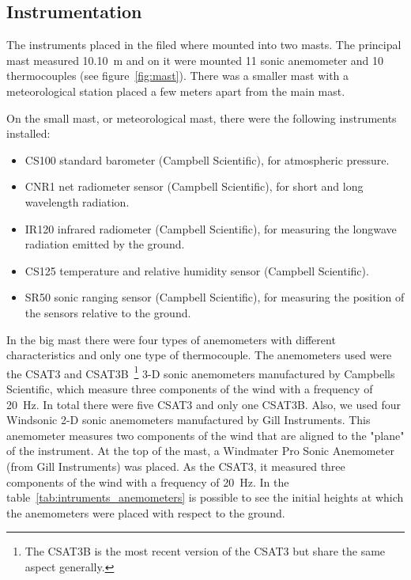 \subsection{Instrumentation} \label{instrumentation}

The instruments placed in the filed where mounted into two masts. The principal mast measured 10.10~m and on it were mounted 11 sonic anemometer and 10 thermocouples (see figure~\ref{fig:mast}). There was a smaller mast with a meteorological station placed a few meters apart from the main mast. 

On the small mast, or meteorological mast, there were the following instruments installed: 
\begin{itemize}
    \item CS100 standard barometer (Campbell Scientific), for atmospheric pressure.
    \item CNR1 net radiometer sensor (Campbell Scientific), for short and long wavelength radiation.
    \item IR120 infrared radiometer (Campbell Scientific), for measuring the longwave radiation emitted by the ground.
    \item CS125 temperature and relative humidity sensor (Campbell Scientific).
    \item SR50 sonic ranging sensor (Campbell Scientific), for measuring the position of the sensors relative to the ground.
\end{itemize}

In the big mast there were four types of anemometers with different characteristics and only one type of thermocouple. The anemometers used were the CSAT3 and CSAT3B~\footnote{The CSAT3B is the most recent version of the CSAT3 but share the same aspect generally.} 3-D sonic anemometers manufactured by Campbells Scientific, which measure three components of the wind with a frequency of 20~Hz. In total there were five CSAT3 and only one CSAT3B. Also, we used four Windsonic 2-D sonic anemometers manufactured by Gill Instruments. This anemometer measures two components of the wind that are aligned to the "plane" of the instrument. At the top of the mast, a Windmater Pro Sonic Anemometer (from Gill Instruments) was placed. As the CSAT3, it measured three components of the wind with a frequency of 20~Hz. In the table~\ref{tab:intruments_anemometers} is possible to see the initial heights at which the anemometers were placed with respect to the ground. 

